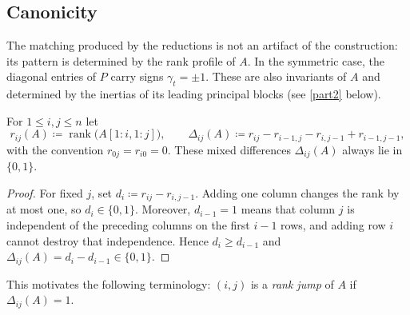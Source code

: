 \documentclass[preprint,12pt]{elsarticle}
\theoremstyle{plain}
\theoremstyle{nonumberplain}
\newtheorem{proof}{Proof}
\numberwithin{equation}{section}
\DeclareMathOperator{\rk}{rank}
\numberwithin{theorem}{section}
\begin{document}
\subsection{Canonicity}

The matching produced by the reductions is not an artifact of the construction: its pattern is determined by the rank profile of $A$.  In the symmetric case, the diagonal entries of $P$ carry signs $\gamma_t = \pm 1$. These are also invariants of $A$ and determined by the inertias of its leading principal blocks (see \cref{part2} below).

For $1 \le i, j \le n$ let
\[
  r_{ij}(A) \coloneq \rk\bigl(A[1:i,1:j]\bigr),
  \qquad
  \Delta_{ij}(A) \coloneq r_{ij} - r_{i-1,j} - r_{i,j-1} + r_{i-1,j-1},
\]
with the convention $r_{0j} = r_{i0} = 0$.  These mixed differences $\Delta_{ij}(A)$ always lie in $\{0,1\}$.

\begin{proof}
  For fixed $j$, set $d_i \coloneq r_{ij}-r_{i,j-1}$.  Adding one column changes the rank by at most one, so $d_i \in \{0,1\}$.  Moreover, $d_{i-1}=1$ means that column $j$ is independent of the preceding columns on the first $i-1$ rows, and adding row $i$ cannot destroy that independence.  Hence $d_i \ge d_{i-1}$ and $\Delta_{ij}(A)=d_i-d_{i-1}\in\{0,1\}$.
\end{proof}

This motivates the following terminology: $(i,j)$ is a \emph{rank jump} of $A$ if $\Delta_{ij}(A) = 1$.
\end{document}
